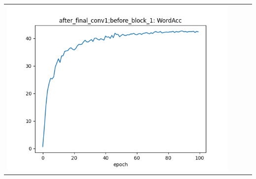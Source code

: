 \begin{longtable}{cccc}
\includegraphics[scale=0.2]{./images/mixup_position/after_final_conv1;before_block_1_WordAcc.png}\\

\end{longtable}
